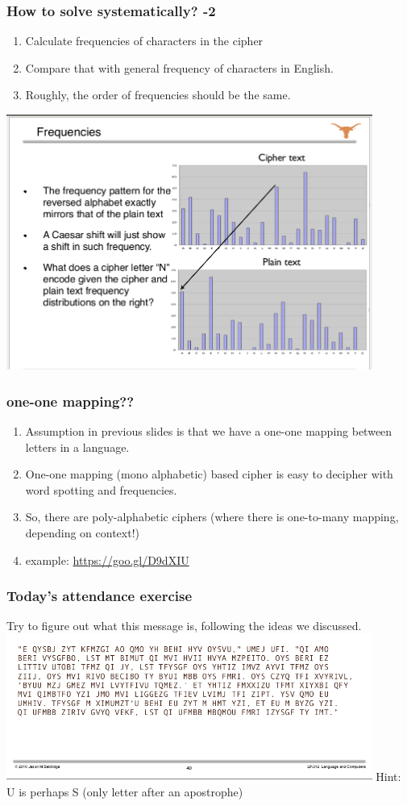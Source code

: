 \documentclass{beamer}
\begin{document}
\begin{frame}
\frametitle{How to solve systematically? -2}
\begin{enumerate}
\item Calculate frequencies of characters in the cipher
\item Compare that with general frequency of characters in English.
\item Roughly, the order of frequencies should be the same.
\end{enumerate} \pause
\includegraphics[width=0.9\textwidth]{frequencies.png}
\end{frame}

\begin{frame}
\frametitle{one-one mapping??}
\begin{enumerate}
\item Assumption in previous slides is that we have a one-one mapping between letters in a language.
\item One-one mapping (mono alphabetic) based cipher is easy to decipher with word spotting and frequencies.
\item So, there are poly-alphabetic ciphers (where there is one-to-many mapping, depending on context!)
\item example: \url{https://goo.gl/D9dXIU}
\end{enumerate}
\end{frame}

\begin{frame}	
\frametitle{Today's attendance exercise}
Try to figure out what this message is, following the ideas we discussed.
\includegraphics[width=0.9\textwidth]{16octexercise.png}
\pause Hint: U is perhaps S (only letter after an apostrophe)
\end{frame}

\end{document}
